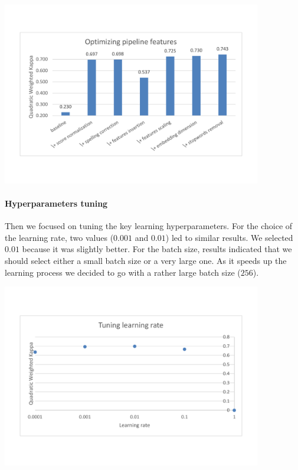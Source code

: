 \documentclass[a4paper,12pt,english]{article}
\begin{document}
\begin{center}
\vspace*{-1.5cm}
\includegraphics[width=0.85\textwidth]{fig/opt_pip_feat.pdf}
\vspace*{-1.5cm}
\end{center}

\paragraph{Hyperparameters tuning} Then we focused on tuning the key learning hyperparameters. For the choice of the learning rate, two values ($0.001$ and $0.01$) led to similar results. We selected $0.01$ because it was slightly better. For the batch size, results indicated that we should select either a small batch size or a very large one. As it speeds up the learning process we decided to go with a rather large batch size ($256$).

\begin{center}
\vspace*{-1.5cm}
\includegraphics[width=0.85\textwidth]{fig/tune_lr.pdf}
\vspace*{-1.5cm}
\end{center}
\end{document}
